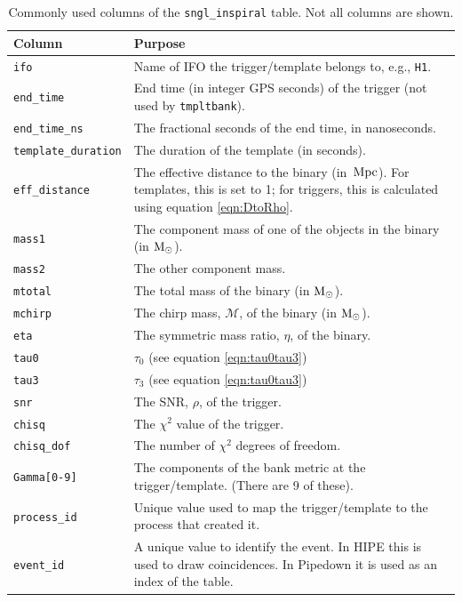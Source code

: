 \begin{table}[p]
\label{tab:sngl_inspiral}
\center
\begin{tabular}{l | p{10cm}}
Column      &   Purpose     \\
\hline \hline
\texttt{ifo}            &   Name of \ac{IFO} the trigger/template belongs to, e.g., \texttt{H1}. \\
\hline
\texttt{end\_time}      &   End time (in integer GPS seconds) of the trigger (not used by \texttt{tmpltbank}). \\
\hline
\texttt{end\_time\_ns}  & The fractional seconds of the end time, in nanoseconds. \\
\hline
\texttt{template\_duration} & The duration of the template (in seconds). \\
\hline
\texttt{eff\_distance}      & The effective distance to the binary (in $\,\mathrm{Mpc}$). For templates, this is set to 1; for triggers, this is calculated using equation \ref{eqn:DtoRho}. \\
\hline
\texttt{mass1}      & The component mass of one of the objects in the binary (in $\mathrm{M_\odot}$). \\
\hline
\texttt{mass2}      & The other component mass. \\
\hline
\texttt{mtotal}     & The total mass of the binary (in $\mathrm{M_\odot}$). \\
\hline
\texttt{mchirp}     & The chirp mass, $\mathcal{M}$, of the binary (in $\mathrm{M_\odot}$). \\
\hline
\texttt{eta}        & The symmetric mass ratio, $\eta$, of the binary. \\
\hline
\texttt{tau0}       & $\tau_0$ (see equation \ref{eqn:tau0tau3}) \\
\hline
\texttt{tau3}       & $\tau_3$ (see equation \ref{eqn:tau0tau3}) \\
\hline
\texttt{snr}        & The \ac{SNR}, $\rho$, of the trigger. \\
\hline
\texttt{chisq}      & The $\chi^2$ value of the trigger. \\
\hline
\texttt{chisq\_dof} & The number of $\chi^2$ degrees of freedom. \\
\hline
\texttt{Gamma[0-9]} & The components of the bank metric at the trigger/template. (There are 9 of these). \\
\hline
\texttt{process\_id}        &   Unique value used to map the trigger/template to the process that created it. \\
\hline
\texttt{event\_id}  & A unique value to identify the event. In \ac{HIPE} this is used to draw coincidences. In Pipedown it is used as an index of the table.
\end{tabular}
\caption{Commonly used columns of the \texttt{sngl\_inspiral} table. Not all columns are shown.}
\end{table}

